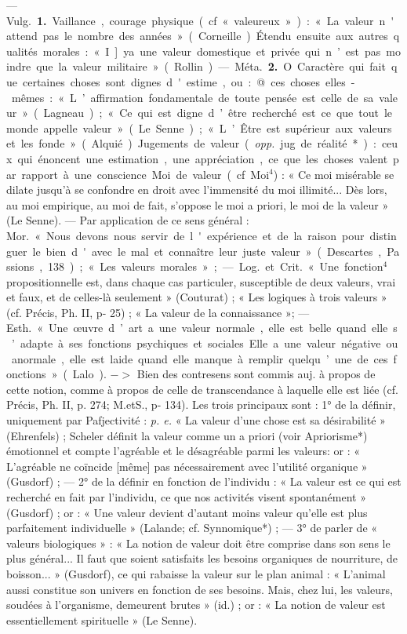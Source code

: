 
	\begin{itemize}[leftmargin=1cm, label=, itemsep=1pt]

 — \si{Vulg.} {\bf 1.} Vaillance, courage
physique (cf. « valeureux ») : « La
valeur n'attend pas le nombre des
années » (Corneille). Étendu ensuite
aux autres qualités morales : « I] ya
une valeur domestique et privée
qui n’est pas moindre que la valeur
militaire » (Rollin).

— \si{Méta.}  {\bf 2.} O. Caractère qui fait
que certaines choses sont dignes
d'estime, ou : @ ces choses elles-mêmes : « L’affirmation fondamentale de toute pensée est celle de sa
valeur » (Lagneau) ; « Ce qui est
digne d’être recherché est ce que
tout le monde appelle valeur »
(Le Senne) ; « L’Être est supérieur
aux valeurs et les fonde » (Alquié).
Jugements de valeur ({\it opp.} jug. de
réalité*) : ceux qui énoncent une
estimation, une appréciation, ce que
les choses valent par rapport à une
conscience. Moi de valeur (cf. Moi$^4$) :
« Ce moi misérable se dilate jusqu’à
se confondre en droit avec l’immensité du moi illimité... Dès lors, au
moi empirique, au moi de fait, s’oppose le moi a priori, le moi de la
valeur » (Le Senne). — Par application de ce sens général : \si{Mor.} « Nous
devons nous servir de l'expérience
et de la raison pour distinguer le
bien d'avec le mal et connaître leur
juste valeur » (Descartes, Passions,
138) ; « Les valeurs morales »; —
\si{Log.} et \si{Crit.} « Une fonction$^4$ propositionnelle est, dans chaque cas particuler, susceptible de deux valeurs,
vrai et faux, et de celles-là seulement » (Couturat) ; « Les logiques à
trois valeurs » (cf. Précis, Ph. II,
p- 25) ; « La valeur de la connaissance »; — \si{Esth.} « Une œuvre d’art
a une valeur normale, elle est belle
quand elle s’adapte à ses fonctions
psychiques et sociales... Elle a une
valeur négative ou anormale, elle
est laide quand elle manque à remplir quelqu’une de ces fonctions »
(Lalo). $->$ Bien des contresens
sont commis auj. à propos de cette
notion, comme à propos de celle de
transcendance à laquelle elle est liée
(cf. Précis, Ph. II, p. 274; M.etS.,
p- 134). Les trois principaux sont :
1° de la définir, uniquement par
Pafjectivité : {\it p. e.} « La valeur d’une
chose est sa désirabilité » (Ehrenfels) ; Scheler définit la valeur comme
un a priori (voir Apriorisme*) émotionnel et compte l’agréable et le
désagréable parmi les valeurs: or :
« L’agréable ne coïncide [même] pas
nécessairement avec l'utilité organique » (Gusdorf) ; — 2° de la définir
en fonction de l'individu : « La
valeur est ce qui est recherché en
fait par l'individu, ce que nos activités visent spontanément » (Gusdorf) ; or : « Une valeur devient
d'autant moins valeur qu’elle est
plus parfaitement individuelle »
(Lalande; cf. Synnomique*) ; —
3° de parler de « valeurs biologiques » : « La notion de valeur doit
être comprise dans son sens le plus
général... Il faut que soient satisfaits les besoins organiques de nourriture, de boisson... » (Gusdorf), ce
qui rabaisse la valeur sur le plan
animal : « L'animal aussi constitue
son univers en fonction de ses besoins. Mais, chez lui, les valeurs,
soudées à l'organisme, demeurent
brutes » (id.) ; or : « La notion de
valeur est essentiellement spirituelle » (Le Senne).


\end{itemize}
